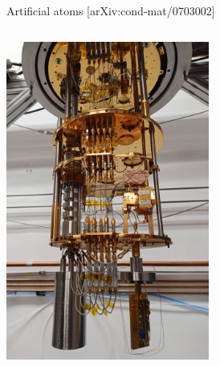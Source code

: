 \documentclass[aspectratio=169,10pt]{beamer}
\begin{document}
\begin{frame}{Artificial atoms \hfill{\small[arXiv:cond-mat/0703002]}}
\begin{columns}
\begin{column}{0.6\textwidth}
      \includegraphics[width=0.5\textwidth]{figures/cryostat.png}
    \end{column}
  \end{columns}
\end{frame}
\end{document}
